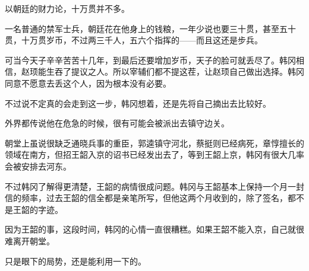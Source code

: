 以朝廷的财力论，十万贯并不多。

一名普通的禁军士兵，朝廷花在他身上的钱粮，一年少说也要三十贯，甚至五十贯，十万贯岁币，不过两三千人，五六个指挥的——而且这还是步兵。

可当今天子辛辛苦苦十几年，到最后还要增加岁币，天子的脸可就丢尽了。韩冈相信，赵顼能生吞了提议之人。所以宰辅们都不提这茬，让赵顼自己做出选择。韩冈同意不愿意去丢这个人，因为根本没有必要。

不过说不定真的会走到这一步，韩冈想着，还是先将自己摘出去比较好。

外界都传说他在危急的时候，很有可能会被派出去镇守边关。

朝堂上虽说很缺乏通晓兵事的重臣，郭逵镇守河北，蔡挺则已经病死，章惇擅长的领域在南方，但招王韶入京的诏书已经发出去了，等到王韶上京，韩冈有很大几率会被安排去河东。

不过韩冈了解得更清楚，王韶的病情很成问题。韩冈与王韶基本上保持一个月一封信的频率，过去王韶的信全都是亲笔所写，但他这两个月收到的，除了签名，都不是王韶的字迹。

因为王韶的事，这段时间，韩冈的心情一直很糟糕。如果王韶不能入京，自己就很难离开朝堂。

只是眼下的局势，还是能利用一下的。


